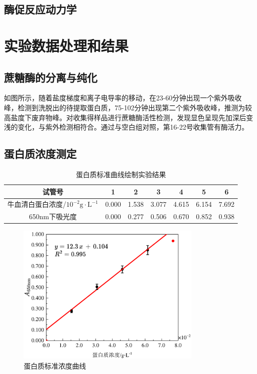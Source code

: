 \subsection{酶促反应动力学}

\section{实验数据处理和结果}

\subsection{蔗糖酶的分离与纯化}
 \par 如图所示，随着盐度梯度和离子电导率的移动，在23-60分钟出现一个紫外吸收峰，检测到洗脱出的待提取蛋白质，75-102分钟出现第二个紫外吸收峰，推测为较高盐度下废弃物峰。对收集得样品进行蔗糖酶活性检测，发现显色呈现先加深后变浅的变化，与紫外检测相符合。通过与空白组对照，第16-22号收集管有酶活力。
 
\subsection{蛋白质浓度测定}

\begin{table}[H]
\centering
\caption{蛋白质标准曲线绘制实验结果}
\label{tab:result_PROTEIN_STD}
\begin{tabular}{@{}ccccccc@{}}
\toprule
试管号       & 1     & 2     & 3     & 4     & 5     & 6     \\ \midrule
牛血清白蛋白浓度/$10^{-2}\mathrm{g \cdot L^{-1}}$ & 0.000 & 1.538 & 3.077 & 4.615 & 6.154 & 7.692 \\
650nm下吸光度 & 0.000 & 0.277 & 0.506 & 0.670 & 0.852 & 0.938 \\ \bottomrule
\end{tabular}
\end{table}

\begin{figure}[H]
    \centering
    \includegraphics[width = 0.8\textwidth]{figure/1124/Protein_STD.pdf}
    \caption{蛋白质标准浓度曲线}
    \label{fig:STD_Protein}
\end{figure}

